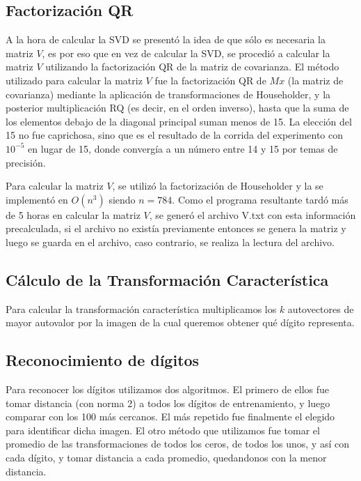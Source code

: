 \subsection{Factorizaci\'on QR}
A la hora de calcular la SVD se present\'o la idea de que s\'olo es necesaria la matriz $V$, es por 
eso que en vez de calcular la SVD, se procedi\'o a calcular la matriz $V$ utilizando la factorizaci\'on 
QR de la matriz de covarianza. El m\'etodo utilizado para calcular la matriz $V$ fue la factorizaci\'on
QR de $Mx$ (la matriz de covarianza) mediante la aplicaci\'on de transformaciones de Householder, y la
posterior multiplicaci\'on RQ (es decir, en el orden inverso), hasta que la suma de los elementos debajo 
de la diagonal principal suman menos de 15. La elecci\'on del 15 no fue caprichosa, sino que es el 
resultado de la corrida del experimento con $10^{-5}$ en lugar de 15, donde converg\'ia a un n\'umero 
entre 14 y 15 por temas de precisi\'on.

Para calcular la matriz $V$, se utiliz\'o la factorizaci\'on de Householder y la se implement\'o en $O(n^3)$ 
siendo $n = 784$. Como el programa resultante tard\'o m\'as de 5 horas en calcular la matriz $V$, se gener\'o 
el archivo V.txt con esta informaci\'on precalculada, si el archivo no exist\'ia previamente entonces se 
genera la matriz y luego se guarda en el archivo, caso contrario, se realiza la lectura del archivo.

\subsection{C\'alculo de la Transformaci\'on Caracter\'istica}
Para calcular la transformaci\'on caracter\'istica multiplicamos los $k$ autovectores de mayor autovalor por
la imagen de la cual queremos obtener qu\'e d\'igito representa.

\subsection{Reconocimiento de d\'igitos}
Para reconocer los d\'igitos utilizamos dos algoritmos. El primero de ellos fue tomar distancia (con norma 2) a
todos los d\'igitos de entrenamiento, y luego comparar con los 100 m\'as cercanos. El m\'as repetido fue finalmente
el elegido para identificar dicha imagen. El otro m\'etodo que utilizamos fue tomar el promedio de las transformaciones
de todos los ceros, de todos los unos, y as\'i con cada d\'igito, y tomar distancia a cada promedio, quedandonos con la
menor distancia.